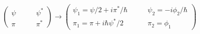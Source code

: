 \begin{equation}
\left( 
\begin{array}{ll}
{\psi } & \qquad {\psi ^{\ast }} \\ 
{\pi } & \qquad {\pi ^{\ast }}%
\end{array}%
\right) \rightarrow \left( 
\begin{array}{ll}
{\psi _{1}=\psi /2+}i{\pi ^{\ast }/\hbar } & \qquad {\psi _{2}=-}i{\phi
_{2}/\hbar } \\ 
{\pi _{1}=\pi +i\hbar \psi ^{\ast }/2} & \qquad {\pi _{2}=\phi _{1}}%
\end{array}%
\right)   \label{chart1}
\end{equation}%
